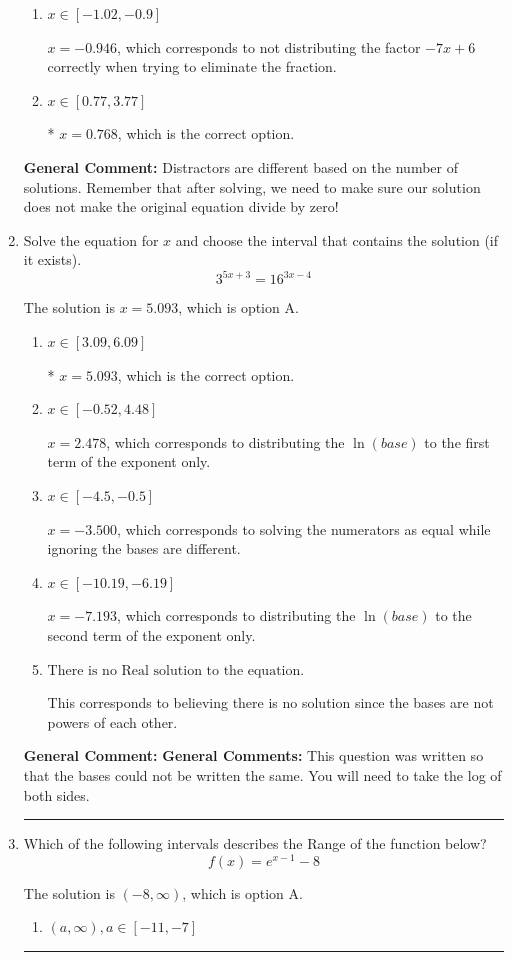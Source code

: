 \documentclass{extbook}[14pt]
\newcommand{\litem}[1]{\item #1

\rule{\textwidth}{0.4pt}}
\begin{document}
\begin{enumerate}
{\begin{enumerate}[label=\Alph*.]
This corresponds to thinking $x = 0.768$ leads to dividing by zero in the original equation, which it does not.
\item \( x \in [-1.02,-0.9] \)

$x = -0.946$, which corresponds to not distributing the factor $-7x + 6$ correctly when trying to eliminate the fraction.
\item \( x \in [0.77,3.77] \)

* $x = 0.768$, which is the correct option.
\end{enumerate}

\textbf{General Comment:} Distractors are different based on the number of solutions. Remember that after solving, we need to make sure our solution does not make the original equation divide by zero!
}
\litem{
Solve the equation for $x$ and choose the interval that contains the solution (if it exists).
\[ 3^{5x+3} = 16^{3x-4} \]

The solution is \( x = 5.093 \), which is option A.\begin{enumerate}[label=\Alph*.]
\item \( x \in [3.09, 6.09] \)

* $x = 5.093$, which is the correct option.
\item \( x \in [-0.52, 4.48] \)

$x = 2.478$, which corresponds to distributing the $\ln(base)$ to the first term of the exponent only.
\item \( x \in [-4.5, -0.5] \)

$x = -3.500$, which corresponds to solving the numerators as equal while ignoring the bases are different.
\item \( x \in [-10.19, -6.19] \)

$x = -7.193$, which corresponds to distributing the $\ln(base)$ to the second term of the exponent only.
\item \( \text{There is no Real solution to the equation.} \)

This corresponds to believing there is no solution since the bases are not powers of each other.
\end{enumerate}

\textbf{General Comment:} \textbf{General Comments:} This question was written so that the bases could not be written the same. You will need to take the log of both sides.
}
\litem{
Which of the following intervals describes the Range of the function below?
\[ f(x) = e^{x-1}-8 \]

The solution is \( (-8, \infty) \), which is option A.\begin{enumerate}[label=\Alph*.]
\item \( (a, \infty), a \in [-11, -7] \)


\end{enumerate}}
\end{enumerate}
\end{document}
